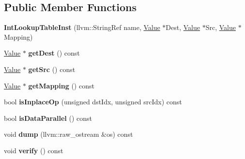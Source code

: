 \subsection*{Public Member Functions}
\begin{DoxyCompactItemize}
\item 
\mbox{\label{classglow_1_1_int_lookup_table_inst_a35c8bd91a922719df77b8857f5ca044c}} 
{\bfseries Int\+Lookup\+Table\+Inst} (llvm\+::\+String\+Ref name, \hyperlink{classglow_1_1_value}{Value} $\ast$Dest, \hyperlink{classglow_1_1_value}{Value} $\ast$Src, \hyperlink{classglow_1_1_value}{Value} $\ast$Mapping)
\item 
\mbox{\label{classglow_1_1_int_lookup_table_inst_a94970cbf0130204bc165c25a69b7ca38}} 
\hyperlink{classglow_1_1_value}{Value} $\ast$ {\bfseries get\+Dest} () const
\item 
\mbox{\label{classglow_1_1_int_lookup_table_inst_aa1b9ef2354302b578734d87286fd9a68}} 
\hyperlink{classglow_1_1_value}{Value} $\ast$ {\bfseries get\+Src} () const
\item 
\mbox{\label{classglow_1_1_int_lookup_table_inst_a922d3535b29d3e75253329ef5cb02652}} 
\hyperlink{classglow_1_1_value}{Value} $\ast$ {\bfseries get\+Mapping} () const
\item 
\mbox{\label{classglow_1_1_int_lookup_table_inst_a61e683dbc6ddcca7da2efa193c47a50d}} 
bool {\bfseries is\+Inplace\+Op} (unsigned dst\+Idx, unsigned src\+Idx) const
\item 
\mbox{\label{classglow_1_1_int_lookup_table_inst_afa09a802f7374953486731a6d88f9e0d}} 
bool {\bfseries is\+Data\+Parallel} () const
\item 
\mbox{\label{classglow_1_1_int_lookup_table_inst_a17682465a4d26187dc70502550ded6c0}} 
void {\bfseries dump} (llvm\+::raw\+\_\+ostream \&os) const
\item 
\mbox{\label{classglow_1_1_int_lookup_table_inst_a676c1709918f3c5fde8dd4fe0b1dfa08}} 
void {\bfseries verify} () const
\end{DoxyCompactItemize}
